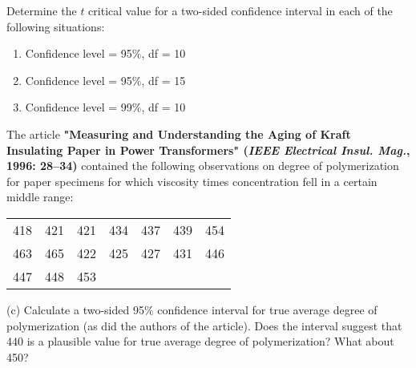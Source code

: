 \documentclass[11pt,letterpaper,boxed]{hmcpset}
\begin{document}
{\begin{solution}
	\vfill
\end{solution}
\newpage


\begin{problem}[7.3.30abc]
	Determine the $t$ critical value for a two-sided confidence interval in each of the following situations:
	\begin{enumerate}
		\item
			Confidence level = 95$\%$, df = 10
		\item
			Confidence level = 95$\%$, df = 15
		\item
			Confidence level = 99$\%$, df = 10
	\end{enumerate}
\end{problem}

\begin{solution}
	\vfill
\end{solution}
\newpage


\begin{problem}[7.3.33c]
	The article \textbf{"Measuring and Understanding the Aging of Kraft Insulating Paper in Power Transformers" (\emph{IEEE Electrical Insul. Mag.}, 1996: 28--34)} contained the following observations on degree of polymerization for paper specimens for which viscosity times concentration fell in a certain middle range:\\
	\begin{center}
		\begin{tabular}{c c c c c c c}
 			418 & 421 & 421 & 434 & 437 & 439 & 454\\
			463 & 465 & 422 & 425 & 427 & 431 & 446\\
			447 & 448 & 453\\
		 \end{tabular}
	\end{center}
\qquad (c) Calculate a two-sided 95$\%$ confidence interval for true average degree of polymerization (as did the authors of the article). Does the interval suggest that 440 is a plausible value for true average degree of polymerization? What about 450?
\end{problem}

\begin{solution}
	\vfill
\end{solution}
\newpage

}
\end{document}
